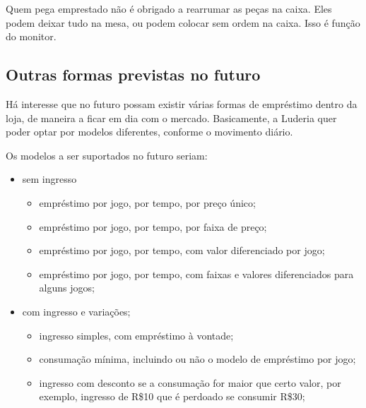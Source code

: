 Quem pega emprestado não é obrigado a rearrumar as peças na caixa. Eles podem deixar tudo na mesa, ou podem colocar sem ordem na caixa. Isso é função do monitor.


\subsection{Outras formas previstas no futuro}

Há interesse que no futuro possam existir várias formas de empréstimo dentro da loja, de maneira a ficar em dia com o mercado. Basicamente, a Luderia quer poder optar por modelos diferentes, conforme o movimento diário. 

Os modelos a ser suportados no futuro seriam:
\begin{itemize}
\item sem ingresso
\begin{itemize}
    \item empréstimo por jogo, por tempo, por preço único;
    \item empréstimo por jogo, por tempo, por faixa de preço;
    \item empréstimo por jogo, por tempo, com valor diferenciado por jogo;
    \item empréstimo por jogo, por tempo, com faixas e valores diferenciados para alguns jogos;
    \end{itemize}
    \item com ingresso e variações;
    \begin{itemize}
    \item ingresso simples, com empréstimo à vontade;
    \item consumação mínima, incluindo ou não o modelo de empréstimo por jogo;
    \item ingresso com desconto se a consumação for maior que certo valor, por exemplo, ingresso de R\$10  que é perdoado se consumir R\$30;
\end{itemize}
\end{itemize}


